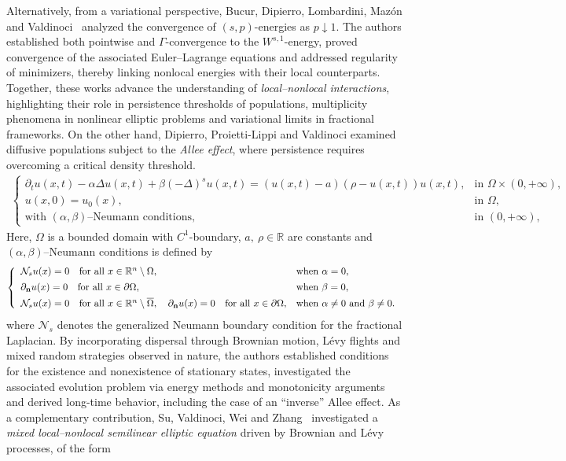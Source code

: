 \documentclass[a4paper,11pt]{amsart}
\theoremstyle{definition}
\def\R{\mathbb{R}}
\def\O{\Omega}
\numberwithin{equation}{section}
\theoremstyle{definition}
\def\O{\Omega}
\begin{document}
Alternatively, from a variational perspective, Bucur, Dipierro, Lombardini, Maz\'on and Valdinoci~\cite{bucur_dipierro_lombardini_mazon_valdinoci_2023} analyzed the convergence of \((s,p)\)-energies as \(p \downarrow 1\). The authors established both pointwise and \(\Gamma\)-convergence to the \(W^{s,1}\)-energy, proved convergence of the associated Euler--Lagrange equations and addressed regularity of minimizers, thereby linking nonlocal energies with their local counterparts. Together, these works advance the understanding of \textit{local--nonlocal interactions}, highlighting their role in persistence thresholds of populations, multiplicity phenomena in nonlinear elliptic problems and variational limits in fractional frameworks. On the other hand, Dipierro, Proietti-Lippi and Valdinoci \cite{dipierro_proietti_valdinoci_2024} examined diffusive populations subject to the \textit{Allee effect}, where persistence requires overcoming a critical density threshold.
\begin{align*}
\left\{
\begin{array}{ll}
\partial_t u(x,t) - \alpha \Delta u(x,t) + \beta (-\Delta)^s u(x,t) 
= (u(x,t)-a)(\rho - u(x,t))u(x,t), 
& \text{in } \Omega \times (0,+\infty), \\[1ex]
u(x,0) = u_0(x), 
& \text{in } \Omega, \\[1ex]
\text{with } (\alpha,\beta)\text{--Neumann conditions}, 
& \text{in } (0,+\infty),
\end{array}
\right.
\end{align*}
Here, $\O$ is a bounded domain with $C^1$-boundary, $a,~\rho\in \R$ are constants and $(\alpha,\beta)\text{--Neumann conditions}$ is defined by
\begin{align*}
\left\{
\begin{array}{ll}
\mathcal{N}_s u(x) = 0 \quad \text{for all } x \in \mathbb{R}^n \setminus \Omega, 
& \text{when } \alpha = 0, \\[1ex]
\partial_{\bf n} u(x) = 0 \quad \text{for all } x \in \partial \Omega, 
& \text{when } \beta = 0, \\[1ex]
\mathcal{N}_s u(x) = 0 \quad \text{for all } x \in \mathbb{R}^n \setminus \overline{\Omega}, \quad 
\partial_{\bf n} u(x) = 0 \quad \text{for all } x \in \partial \Omega, 
& \text{when } \alpha \neq 0 \ \text{and } \beta \neq 0.
\end{array}
\right.
\end{align*}
where $\mathcal{N}_s$ denotes the generalized Neumann boundary condition for the fractional Laplacian. By incorporating dispersal through Brownian motion, L\'evy flights and mixed random strategies observed in nature, the authors established conditions for the existence and nonexistence of stationary states, investigated the associated evolution problem via energy methods and monotonicity arguments and derived long-time behavior, including the case of an ``inverse'' Allee effect. As a complementary contribution, Su, Valdinoci, Wei and Zhang~\cite{su_valdinoci_wei_zhang_2024} investigated a \emph{mixed local–nonlocal semilinear elliptic equation} driven by Brownian and Lévy processes, of the form
\end{document}

